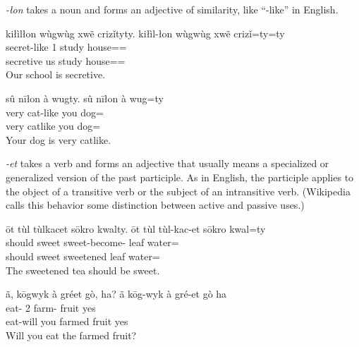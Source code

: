 \documentclass[12pt]{article}
\begin{document}
    \textit{-łon} takes a noun and forms an adjective of similarity,
    like ``-like'' in English.

    \begin{exe}
        \ex
        kiłìlłon wùgwùg xwẽ crizǐtyty.
        \glll
        kiłìl-łon wùgwùg xwẽ crizǐ=ty=ty \\
        secret-like 1\Pl{} study house=\Poss{}=\Poss{} \\
        secretive us study house=\Poss{}=\Poss{} \\
        \glt
        Our school is secretive.
    \end{exe}

    \begin{exe}
        \ex
        sû nīłon à wugty.
        \glll
        sû nīłon à wug=ty \\
        very cat-like you dog=\Poss{} \\
        very catlike you dog=\Poss{} \\
        \glt
        Your dog is very catlike.
    \end{exe}

    \textit{-et} takes a verb and forms an adjective that
    usually means a specialized or generalized version of the past participle.
    As in English, the participle applies to the object of a transitive verb
    or the subject of an intransitive verb.
    (Wikipedia calls this behavior some distinction between active and passive uses.)

    \begin{exe}
        \ex
        ōt tùl tùlkacet sōkro kwalty.
        \glll
        ōt tùl tùl-kac-et sōkro kwal=ty \\
        should sweet sweet-become-\Ptcp{} leaf water=\Poss{} \\
        should sweet sweetened leaf water=\Poss{} \\
        \glt
        The sweetened tea should be sweet.
    \end{exe}

    \begin{exe}
        \ex
        ã, kōgwyk à gréet gò, ha?
        \glll
        ã kōg-wyk à gré-et gò ha \\
        \Q{} eat-\Fut{} 2\Sg{} farm-\Ptcp{} fruit yes \\
        \Q{} eat-will you farmed fruit yes \\
        \glt
        Will you eat the farmed fruit?
    \end{exe}
\end{document}
